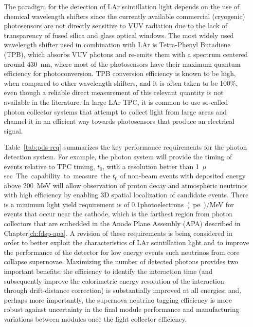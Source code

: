 The paradigm for the detection of LAr scintillation light depends on the use of 
chemical wavelength shifters since the currently available commercial (cryogenic) photosensors are not 
directly sensitive to VUV radiation due to the lack of transparency of fused silica and 
glass optical windows. The most widely used wavelength shifter used in 
combination with LAr is Tetra-Phenyl Butadiene (TPB), which absorbs VUV photons 
and re-emits them with a spectrum centered around \SI{430}{nm}, where most of the 
photosensors have their maximum quantum efficiency for photoconversion. TPB conversion efficiency 
is known to be high, when compared to other wavelength shifters, and 
it is often taken to be \num{100}\%, even though a reliable direct measurement of this 
relevant quantity is not available in the literature. 
In large LAr TPC, it is common to use so-called photon collector systems that attempt to 
collect light from large areas and channel it in an efficient way towards  
photosensors that produce an electrical signal.


Table~\ref{tab:pds-req} summarizes the key performance requirements for the photon detection system.
For example, the photon system will provide the timing of events relative to TPC timing, $t_0$, with a 
resolution better than \SI{1}{$\mu$sec}.  The capability to measure the $t_0$ of non-beam events with deposited 
energy above \SI{200}{MeV} will allow observation of proton decay and atmospheric neutrinos with high 
efficiency by enabling 3D spatial localization of candidate events. 
There is a minimum light yield requirement is of  \num{0.1}\si{photoelectrons(pe)/MeV} for events that occur near the cathode, which is the farthest region from photon collectors that are embedded in the Anode Plane Assembly (APA) described in Chapter\ref{ch:fdsp-apa}. 
A revision of these requirements is being considered in order to better exploit the 
characteristics of LAr scintillation light and to improve the performance of the detector for low energy events such neutrinos from core collapse supernovae. Maximizing the number of detected photons provides two important benefits: the efficiency to identify the interaction time 
(and subsequently improve the calorimetric energy resolution of the interaction through drift-distance correction) is substantially improved at all energies; and, perhaps more importantly, the supernova neutrino tagging efficiency is more robust against uncertainty in the final module performance and manufacturing variations between modules once the light collector efficiency. 

